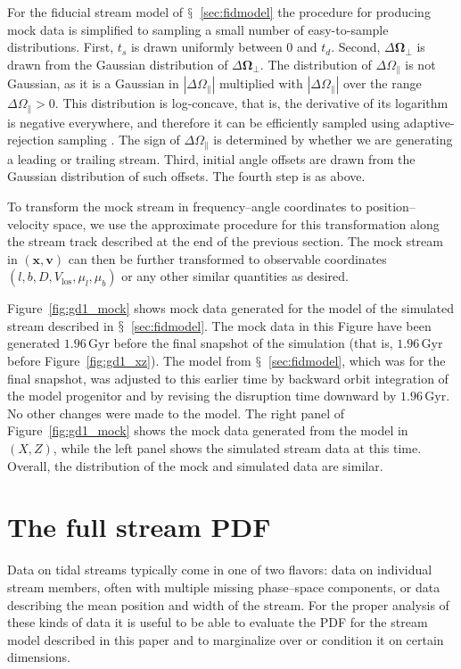 \documentclass{emulateapj}
\renewcommand{\figurename}{Figure}
\newcommand{\sectionname}{$\mathsection$}
\renewcommand{\vec}[1]{\ensuremath{\mathbf{#1}}}
\newcommand{\vecx}{\ensuremath{\vec{x}}}
\newcommand{\vecv}{\ensuremath{\vec{v}}}
\newcommand{\veco}{\ensuremath{\vec{\Omega}}}
\newcommand{\Gyr}{\ensuremath{\,\mathrm{Gyr}}}
\newcommand{\opar}{\ensuremath{\Omega_\parallel}}
\newcommand{\operp}{\ensuremath{\veco_\perp}}
\newcommand{\vlos}{\ensuremath{V_{\mathrm{los}}}}
\newcommand{\pmll}{\ensuremath{\mu_l}}
\newcommand{\pmbb}{\ensuremath{\mu_b}}
\begin{document}
For the fiducial stream model of \sectionname~\ref{sec:fidmodel} the
procedure for producing mock data is simplified to sampling a small
number of easy-to-sample distributions. First, $t_s$ is drawn
uniformly between $0$ and $t_d$. Second, $\Delta \operp$ is drawn from
the Gaussian distribution of $\Delta \operp$. The distribution of
$\Delta \opar$ is not Gaussian, as it is a Gaussian in $|\Delta
\opar|$ multiplied with $|\Delta \opar|$ over the range $\Delta \opar
> 0$. This distribution is log-concave, that is, the derivative of its
logarithm is negative everywhere, and therefore it can be efficiently
sampled using adaptive-rejection sampling \citep{Gilks92a}. The sign
of $\Delta \opar$ is determined by whether we are generating a leading
or trailing stream. Third, initial angle offsets are drawn from the
Gaussian distribution of such offsets. The fourth step is as above.

To transform the mock stream in frequency--angle coordinates to
position--velocity space, we use the approximate procedure for this
transformation along the stream track described at the end of the
previous section. The mock stream in $(\vecx,\vecv)$ can then be
further transformed to observable coordinates
$(l,b,D,\vlos,\pmll,\pmbb)$ or any other similar quantities as
desired.

\figurename~\ref{fig:gd1_mock} shows mock data generated for the model
of the simulated stream described in
\sectionname~\ref{sec:fidmodel}. The mock data in this Figure have
been generated $1.96\Gyr$ before the final snapshot of the simulation
(that is, $1.96\Gyr$ before \figurename~\ref{fig:gd1_xz}). The model
from \sectionname~\ref{sec:fidmodel}, which was for the final
snapshot, was adjusted to this earlier time by backward orbit
integration of the model progenitor and by revising the disruption
time downward by $1.96\Gyr$. No other changes were made to the
model. The right panel of \figurename~\ref{fig:gd1_mock} shows the
mock data generated from the model in $(X,Z)$, while the left panel
shows the simulated stream data at this time. Overall, the
distribution of the mock and simulated data are similar.


\section{The full stream PDF}\label{sec:pdf}

Data on tidal streams typically come in one of two flavors: data on
individual stream members, often with multiple missing phase--space
components, or data describing the mean position and width of the
stream. For the proper analysis of these kinds of data it is useful to
be able to evaluate the PDF for the stream model described in this
paper and to marginalize over or condition it on certain dimensions.
\end{document}
